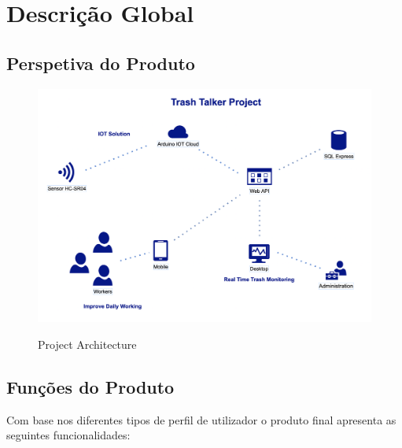 \documentclass{scrreprt}
\begin{document}
	
	{\let\clearpage\relax \chapter{Descrição Global}}
	
	\section{Perspetiva do Produto}
	\begin{figure}[H]
		\centering
		\includegraphics[scale=.45]{imagens/projectArchitecture}
		\par Project Architecture
		\label{fig:porjectArchitecture}
	\end{figure}
	
	\newpage
	
	\section{Funções do Produto}
	
	Com base nos diferentes tipos de perfil de utilizador o produto final apresenta as seguintes funcionalidades:\newline\newline
	
\end{document}
